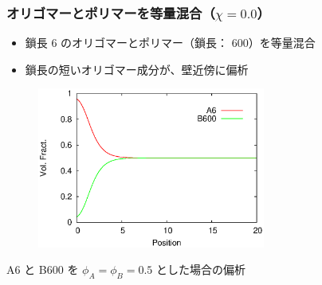 \documentclass[12pt, dvipdfmx]{beamer}
\begin{document}
\begin{frame}\frametitle {オリゴマーとポリマーを等量混合（$\chi = 0.0$）}

\begin{itemize}
	\item 鎖長 6 のオリゴマーとポリマー（鎖長： 600）を等量混合
	\item 鎖長の短いオリゴマー成分が、壁近傍に偏析
\end{itemize}

\vspace{-0.5\baselineskip}
\begin{figure}[htbp]
	\begin{center}
		\includegraphics[width=75mm]{Sym_A6B600_Chi_0.eps}
	\end{center}
\end{figure}

\begin{center}
\vspace{-0.5\baselineskip}
{\small A6 と B600 を $\phi_A = \phi_B = 0.5$ とした場合の偏析}
\end{center}

\end{frame}
\end{document}
